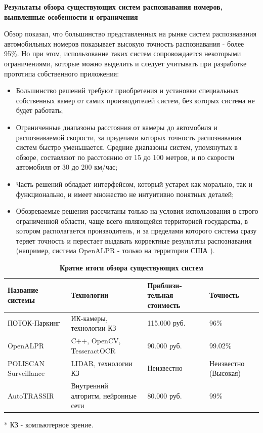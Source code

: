 \documentclass[a4paper,12pt]{article}
\begin{document}
\textbf{Результаты обзора существующих систем распознавания номеров, выявленные особенности и ограничения}

Обзор показал, что большинство представленных на рынке систем распознавания автомобильных номеров показывает высокую точность распознавания - более 95\%. Но при этом, использование таких систем сопровождается некоторыми ограничениями, которые можно выделить и следует учитывать при разработке прототипа собственного приложения:
\begin{itemize}
    \item Большинство решений требуют приобретения и установки специальных собственных камер от самих производителей систем, без которых система не будет работать;
    \item Ограниченные диапазоны расстояния от камеры до автомобиля и распознаваемой скорости, за пределами которых точность распознавания систем быстро уменьшается. Средние диапазоны систем, упомянутых в обзоре, составляют по расстоянию от 15 до 100 метров, и по скорости автомобиля от 30 до 200 км/час;
    \item Часть решений обладает интерфейсом, который устарел как морально, так и функционально, и имеет множество не интуитивно понятных деталей;
    \item Обозреваемые решения рассчитаны только на условия использования в строго ограниченной области, чаще всего являющейся территорией государства, в котором располагается производитель, и за пределами которого система сразу теряет точность и перестает выдавать корректные результаты распознавания (например, система OpenALPR - только на территории США \cite{openalpr}).
\end{itemize}

\begin{table}[H]
\centering
\begin{tabular}{|p{4.5cm}|p{4.5cm}|p{3.5cm}|p{2.5cm}|}
\hline
\textbf{Название системы} & \textbf{Технологии} & \textbf{Приблизи-тельная стоимость} & \textbf{Точность} \\
\hline
ПОТОК-Паркинг & ИК-камеры, технологии КЗ & 115.000 руб. & 96\% \\ 
\hline
OpenALPR & C++, OpenCV, TesseractOCR & 90.000 руб. & 99.02\% \\ 
\hline
POLISCAN Surveillance & LIDAR, технологии КЗ & Неизвестно & Неизвестно (Высокая) \\ 
\hline
AutoTRASSIR & Внутренний алгоритм, нейронные сети & 80.000 руб. & 99\% \\ 
\hline
\end{tabular}
\caption{\textbf{Кратие итоги обзора существующих систем}}
\end{table}
* КЗ - компьютерное зрение.
\end{document}

